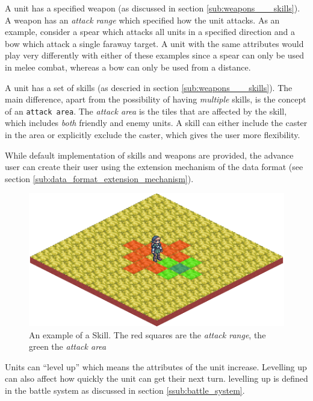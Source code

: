 A unit has a  specified weapon (as discussed in section \ref{sub:weapons___skills}).  A weapon has an \emph{attack range} which specified how the unit attacks.  As an example, consider a spear which attacks all units in a specified direction and a bow which attack a single faraway target. A unit with the same attributes would play very differently with either of these examples since a spear can only be used in melee combat, whereas a bow can only be used from a distance.

A unit has a set of skills (as descried in section \ref{sub:weapons___skills}). The main difference, apart from the possibility of having \emph{multiple} skills, is the concept of an \texttt{attack area}.  The \emph{attack area} is the tiles that are affected by the skill, which includes \emph{both} friendly and enemy units. A skill can either include the caster in the area or explicitly exclude the caster, which gives the user more flexibility.

While default implementation of skills and weapons are provided, the advance user can create their user using the extension mechanism of the data format (see section \ref{sub:data_format_extension_mechanism}).

\begin{figure}[htbp]
	\centering
 		\includegraphics[scale=0.5]{figures/skill.png}
	\caption{An example of a Skill. The red squares are the \emph{attack range}, the green the \emph{attack area}}
	\label{fig:figures_engine_Skills}
\end{figure}

Units can ``level up'' which means the attributes  of the unit increase.  Levelling up can also affect how quickly the unit can get their next turn. levelling up is defined in the battle system as discussed in section \ref{ssub:battle_system}.


